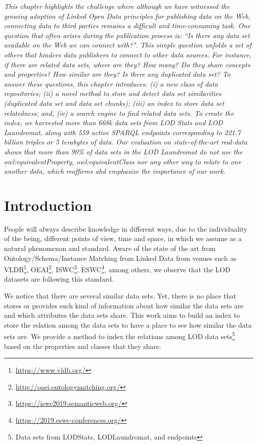 \textit{This chapter highlights the challenge where although we have witnessed the growing adoption of Linked Open Data principles for publishing data on the Web, connecting data to third parties remains a difficult and time-consuming task. One question that often arises during the publication process is: ``Is there any data set available on the Web we can connect with?". This simple question unfolds a set of others that hinders data publishers to connect to other data sources. For instance, if there are related data sets, where are they? How many? Do they share concepts and properties? How similar are they? Is there any duplicated data set?
To answer these questions, this chapter introduces: (i) a new class of data repositories; (ii) a novel method to store and detect data set similarities (duplicated data set and data set chunks); (iii) an index to store data set relatedness; and, (iv) a search engine to find related data sets.
To create the index, we harvested more than 668k data sets from LOD Stats and LOD Laundromat, along with 559 active SPARQL endpoints corresponding to 221.7 billion triples or 5 terabytes of data. 
Our evaluation on state-of-the-art real-data shows that more than 90\% of data sets in the LOD Laundromat do not use the \textit{owl:equivalentProperty}, \textit{owl:equivalentClass} nor any other way to relate to one another data, which reaffirms ahd emphasize the importance of our work.}

\section{Introduction}
People will always describe knowledge in different ways, due to the individuality of the being, different points of view, time and space, in which we assume as a natural phenomenon and standard. Aware of the state of the art from Ontology/Schema/Instance Matching from Linked Data from venues such as VLDB\footnote{\url{https://www.vldb.org/}}, OEAI\footnote{\url{http://oaei.ontologymatching.org/}}, ISWC\footnote{\url{https://iswc2019.semanticweb.org/}}, ESWC\footnote{\url{https://2019.eswc-conferences.org/}}, among others, we observe that the LOD datasets are following this standard.

We notice that there are several similar data sets. Yet, there is no place that stores or provides such kind of information about how similar the data sets are and which attributes the data sets share. This work aims to build an index to store the relation among the data sets to have a place to see how similar the data sets are. We provide a method to index the relations among LOD data sets\footnote{Data sets from LODStats, LODLaundromat, and endpoints} based on the properties and classes that they share.

